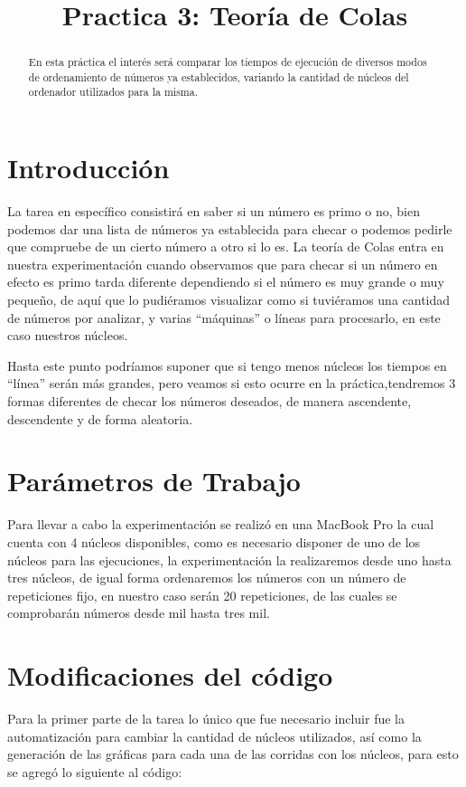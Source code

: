 \documentclass[a4paper]{article}
\title{Practica 3: Teor\'ia de Colas}
\begin{document}
\maketitle

\begin{abstract}
En esta práctica el interés será comparar los tiempos de ejecución de diversos modos de ordenamiento de números ya establecidos, variando la cantidad de núcleos del ordenador utilizados para la misma.
\end{abstract}

\section{Introducci\'on}
La tarea en específico consistirá en saber si un número es primo o no, bien podemos dar una lista de números ya establecida para checar o podemos pedirle que compruebe de un cierto número a otro si lo es. La teoría de Colas entra en nuestra experimentación cuando observamos que para checar si un número en efecto es primo tarda diferente dependiendo si el número es muy grande o muy pequeño, de aquí que lo pudiéramos visualizar como si tuviéramos una cantidad de números por analizar, y varias “máquinas” o líneas para procesarlo, en este caso nuestros núcleos. 

Hasta este punto podríamos suponer que si tengo menos núcleos los tiempos en “línea” serán más grandes, pero veamos si esto ocurre en la práctica,tendremos 3 formas diferentes de checar los números deseados, de manera ascendente, descendente y de forma aleatoria.

\section{Par\'ametros de Trabajo}

Para llevar a cabo la experimentación se realizó en una MacBook Pro la cual cuenta con 4 núcleos disponibles, como es necesario disponer de uno de los núcleos para las ejecuciones, la experimentación la realizaremos desde uno hasta tres núcleos, de igual forma ordenaremos los números con un número de repeticiones fijo, en nuestro caso serán 20 repeticiones, de las cuales se comprobarán números desde mil hasta tres mil.

\section{Modificaciones del código}

Para la primer parte de la tarea lo único que fue necesario incluir fue la automatización para cambiar la cantidad de núcleos utilizados, así como la generación de las gráficas para cada una de las corridas con los núcleos, para esto se agregó lo siguiente al código:
\end{document}
